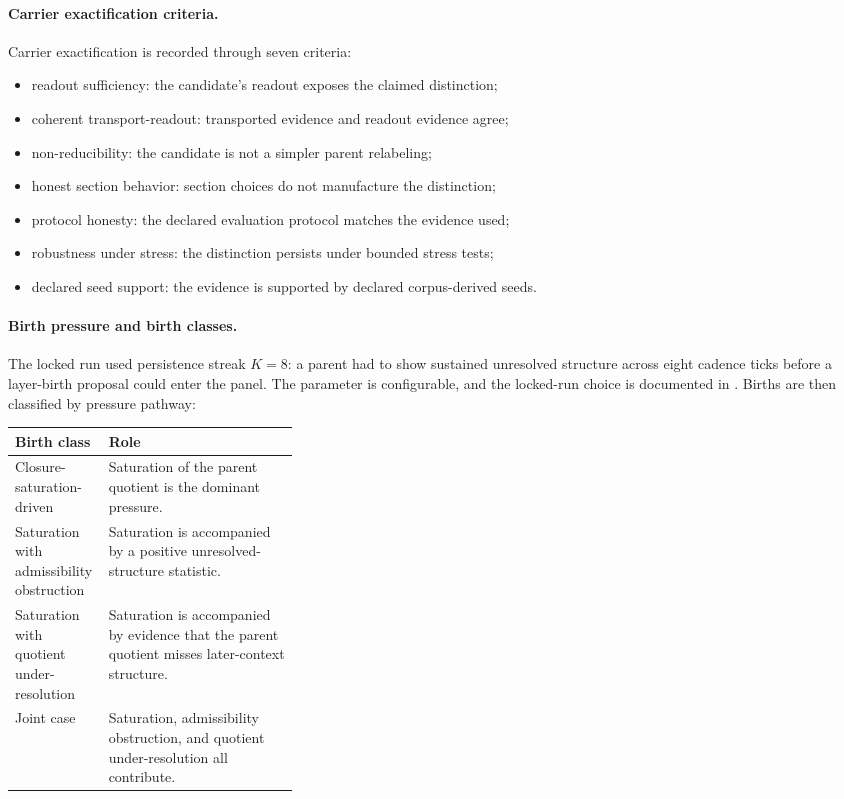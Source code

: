 \documentclass{article}
\theoremstyle{definition}
\begin{document}
\paragraph{Carrier exactification criteria.}
Carrier exactification is recorded through seven criteria:
\begin{itemize}
\item readout sufficiency: the candidate's readout exposes the claimed distinction;
\item coherent transport-readout: transported evidence and readout evidence agree;
\item non-reducibility: the candidate is not a simpler parent relabeling;
\item honest section behavior: section choices do not manufacture the distinction;
\item protocol honesty: the declared evaluation protocol matches the evidence used;
\item robustness under stress: the distinction persists under bounded stress tests;
\item declared seed support: the evidence is supported by declared corpus-derived seeds.
\end{itemize}

\paragraph{Birth pressure and birth classes.}
The locked run used persistence streak \(K=8\): a parent had to show sustained unresolved structure across eight cadence ticks before a layer-birth proposal could enter the panel. The parameter is configurable, and the locked-run choice is documented in . Births are then classified by pressure pathway:
\begin{center}
\footnotesize
\begin{tabularx}{\linewidth}{@{}>{\raggedright\arraybackslash}p{0.33\linewidth}>{\raggedright\arraybackslash}X@{}}
\toprule
Birth class & Role \\
\midrule
Closure-saturation-driven & Saturation of the parent quotient is the dominant pressure. \\
Saturation with admissibility obstruction & Saturation is accompanied by a positive unresolved-structure statistic. \\
Saturation with quotient under-resolution & Saturation is accompanied by evidence that the parent quotient misses later-context structure. \\
Joint case & Saturation, admissibility obstruction, and quotient under-resolution all contribute. \\
\bottomrule
\end{tabularx}
\end{center}
\end{document}
